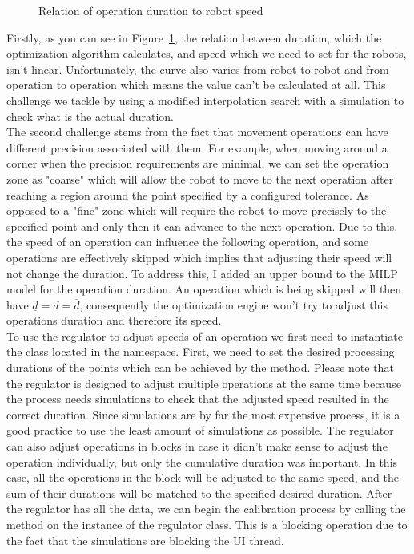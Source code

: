 \begin{figure}[ht]
	\caption{Relation of operation duration to robot speed}
	\centering
	
	\label{fig:SpeedVsDuration}
\end{figure}

Firstly, as you can see in Figure~\ref{fig:SpeedVsDuration}, the relation between duration, which the optimization algorithm calculates, and speed which we need to set for the robots, isn't linear. Unfortunately, the curve also varies from robot to robot and from operation to operation which means the value can't be calculated at all. This challenge we tackle by using a modified interpolation search with a simulation to check what is the actual duration. \\

The second challenge stems from the fact that movement operations can have different precision associated with them. For example, when moving around a corner when the precision requirements are minimal, we can set the operation zone as "coarse" which will allow the robot to move to the next operation after reaching a region around the point specified by a configured tolerance. As opposed to a "fine" zone which will require the robot to move precisely to the specified point and only then it can advance to the next operation. Due to this, the speed of an operation can influence the following operation, and some operations are effectively skipped which implies that adjusting their speed will not change the duration. To address this, I added an upper bound to the MILP model for the operation duration. An operation which is being skipped will then have $\underline{d} = d = \overline{d}$, consequently the optimization engine won't try to adjust this operations duration and therefore its speed. \\

To use the regulator to adjust speeds of an operation we first need to instantiate the  class located in the  namespace. First, we need to set the desired processing durations of the points which can be achieved by the  method. Please note that the regulator is designed to adjust multiple operations at the same time because the process needs simulations to check that the adjusted speed resulted in the correct duration. Since simulations are by far the most expensive process, it is a good practice to use the least amount of simulations as possible. The regulator can also adjust operations in blocks in case it didn't make sense to adjust the operation individually, but only the cumulative duration was important. In this case, all the operations in the block will be adjusted to the same speed, and the sum of their durations will be matched to the specified desired duration. After the regulator has all the data, we can begin the calibration process by calling the  method on the instance of the regulator class. This is a blocking operation due to the fact that the simulations are blocking the UI thread. \\

